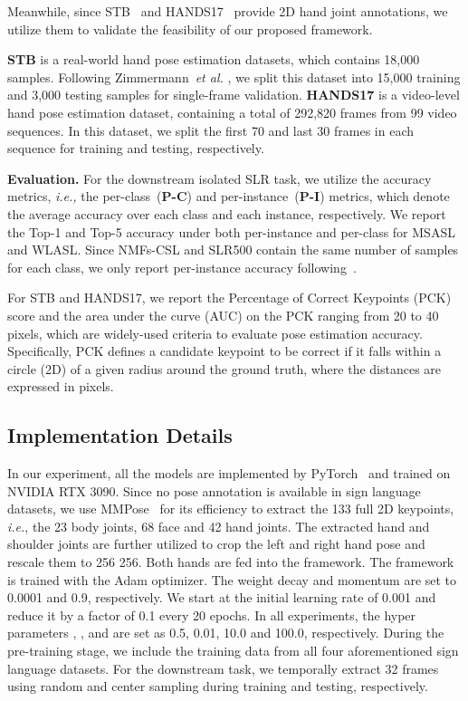 \documentclass[10pt,twocolumn,letterpaper]{article}
\begin{document}
Meanwhile, since STB~\cite{zhang2017hand} and HANDS17~\cite{yuan20172017} provide 2D hand joint annotations, we utilize them to validate the feasibility of our proposed framework.

\textbf{STB} is a real-world hand pose estimation datasets, which contains 18,000 samples. 
Following Zimmermann~\emph{et al.} \cite{zimmermann2017learning}, we split this dataset into 15,000 training and 3,000 testing samples for single-frame validation.
\textbf{HANDS17} is a video-level hand pose estimation dataset, containing a total of 292,820 frames from 99 video sequences. 
In this dataset, we split the first 70 and last 30 frames in each sequence for training and testing, respectively.


\noindent
\textbf{Evaluation.} 
For the downstream isolated SLR task, we utilize the accuracy metrics, \emph{i.e.,} the per-class~(\textbf{P-C}) and per-instance~(\textbf{P-I}) metrics, which denote the average accuracy over each class and each instance, respectively. 
We report the Top-1 and Top-5 accuracy under both per-instance and per-class for MSASL and WLASL.
Since NMFs-CSL and SLR500 contain the same number of samples for each class, we only report per-instance accuracy following~\cite{hu2020global, huang2018attention}.

For STB and HANDS17, we report the Percentage of Correct Keypoints (PCK) score and the area under the curve (AUC) on the PCK ranging from 20 to 40 pixels, which are widely-used criteria to evaluate pose estimation accuracy. 
Specifically, PCK defines a candidate keypoint to be correct if it falls within a circle (2D) of a given radius around the ground truth, where the distances are expressed in pixels.


\subsection{Implementation Details}
In our experiment, all the models are implemented by PyTorch~\cite{paszke2019pytorch} and trained on NVIDIA RTX 3090. 
Since no pose annotation is available in sign language datasets, we use MMPose~\cite{mmpose2020} for its efficiency to extract the 133 full 2D keypoints, \textit{i.e.}, the 23 body joints, 68 face and 42 hand joints.
The extracted hand and shoulder joints are further utilized to crop the left and right hand pose and rescale them to 256  256.
Both hands are fed into the framework.
The framework is trained with the Adam optimizer. 
The weight decay and momentum are set to 0.0001 and 0.9, respectively.
We start at the initial learning rate of 0.001 and reduce it by a factor of 0.1 every 20 epochs.
In all experiments, the hyper parameters , ,  and  are set as 0.5, 0.01, 10.0 and 100.0, respectively.
During the pre-training stage, we include the training data from all four aforementioned sign language datasets.
For the downstream task, we temporally extract 32 frames using random and center sampling during training and testing, respectively.
\end{document}
